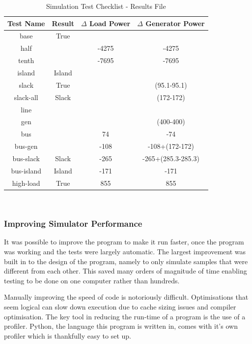 \documentclass[a4paper,oneside,12pt]{report}
\begin{document}
\begin{table}[htbp]
\caption{Simulation Test Checklist - Results File}
\label{table_sim_test_b}
\centering
\begin{tabular}{c||c||c||c}
\bfseries Test Name & \bfseries Result & \bfseries $\Delta$ Load Power & \bfseries $\Delta$ Generator Power \\
\hline \hline
base      & True  &             & \\
half      &       & -4275       & -4275 \\
tenth     &       & -7695       & -7695 \\
island    & Island&             & \\
slack     & True  &             & (95.1-95.1) \\
slack-all & Slack &             & (172-172) \\
line      &       &             & \\
gen       &       &             & (400-400) \\
bus       &       & 74          & -74 \\
bus-gen   &       & -108        & -108+(172-172) \\
bus-slack & Slack & -265        & -265+(285.3-285.3) \\
bus-island& Island& -171        & -171 \\
high-load & True  & 855         & 855 \\
\hline
\end{tabular}\\
\end{table}

\subsubsection{Improving Simulator Performance}

It was possible to improve the program to make it run faster, once the program was working and the tests were largely automatic. The largest
improvement was built in to the design of the program, namely to only
simulate samples that were different from each other. This saved many
orders of magnitude of time enabling testing to be done on one computer
rather than hundreds.

Manually improving the speed of code is notoriously difficult. Optimisations that seem logical can slow down execution due to cache sizing issues and compiler optimisation. The key tool in reducing the run-time of a program is the use of a profiler. Python, the language this program is written in, comes with it's own profiler which is thankfully easy to set up.
\end{document}

